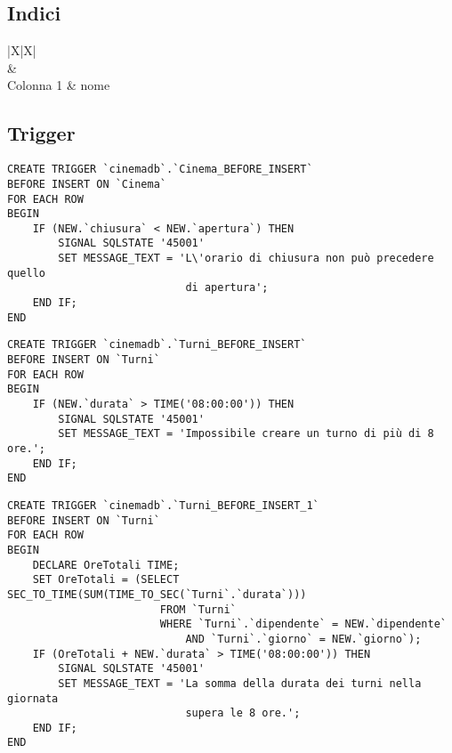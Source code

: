 \subsection*{Indici}
%
%
\begin{tabularx}{\linewidth}{|X|X|}
    \hline
     \\\hline
     & 
    \\\hline
    Colonna 1
     & \textlangle{}nome\textrangle{}
    \\ \hline
\end{tabularx}

\subsection*{Trigger}
%
%

\begin{verbatim}
CREATE TRIGGER `cinemadb`.`Cinema_BEFORE_INSERT`
BEFORE INSERT ON `Cinema`
FOR EACH ROW
BEGIN
    IF (NEW.`chiusura` < NEW.`apertura`) THEN
        SIGNAL SQLSTATE '45001'
        SET MESSAGE_TEXT = 'L\'orario di chiusura non può precedere quello
                            di apertura';
    END IF;
END
\end{verbatim}

\begin{verbatim}
CREATE TRIGGER `cinemadb`.`Turni_BEFORE_INSERT`
BEFORE INSERT ON `Turni`
FOR EACH ROW
BEGIN
    IF (NEW.`durata` > TIME('08:00:00')) THEN
        SIGNAL SQLSTATE '45001'
        SET MESSAGE_TEXT = 'Impossibile creare un turno di più di 8 ore.';
    END IF;
END
\end{verbatim}

\begin{verbatim}
CREATE TRIGGER `cinemadb`.`Turni_BEFORE_INSERT_1` 
BEFORE INSERT ON `Turni` 
FOR EACH ROW
BEGIN
    DECLARE OreTotali TIME;
    SET OreTotali = (SELECT SEC_TO_TIME(SUM(TIME_TO_SEC(`Turni`.`durata`)))
                        FROM `Turni`
                        WHERE `Turni`.`dipendente` = NEW.`dipendente`
                            AND `Turni`.`giorno` = NEW.`giorno`);
    IF (OreTotali + NEW.`durata` > TIME('08:00:00')) THEN
        SIGNAL SQLSTATE '45001'
        SET MESSAGE_TEXT = 'La somma della durata dei turni nella giornata
                            supera le 8 ore.';
    END IF;
END
\end{verbatim}

